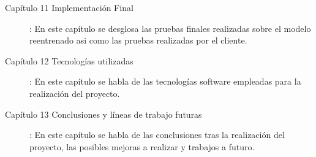 \begin{description}
\item[Capítulo 11 Implementación Final]: En este capítulo se desglosa las pruebas finales realizadas sobre el modelo reentrenado asi como las pruebas realizadas por el cliente.

\item[Capítulo 12 Tecnologías utilizadas]: En este capítulo se habla de las tecnologías software empleadas para la realización del proyecto.

\item[Capítulo 13 Conclusiones y líneas de trabajo futuras]: En este capítulo se habla de las conclusiones tras la realización del proyecto, las posibles mejoras a realizar y trabajos a futuro. 

\end{description}